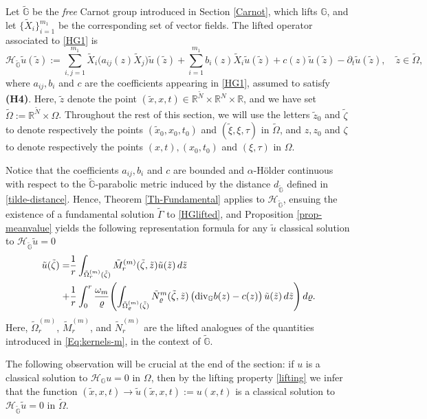 \documentclass[11pt,a4paper]{article}
\numberwithin{equation}{section}
\newcommand{\R}{\mathbb{R}}
\def \rn {{\mathbb {R}}^{N}}
\def \rnm {{\mathbb {R}}^{\tilde N}}
\def \r {\varrho}
\def \tt {\tilde}
\def \GG {{\mathbb{G}}}
\def \div {{\text{\rm div}}}
\def \p {\partial}
\def \ti {\times}
\def \H {\mathscr{H}_\GG}
\def \HG {\mathscr{H}_{\tilde\GG}}
\def \a {{\alpha}}
\def \G {{\Gamma}}
\def \t {{\tau}}
\def \x {{\xi}}
\def \z {{\zeta}}
\def \O {{\Omega}}
\begin{document}
{{\medskip

Let $\tt \GG$ be the \emph{free} Carnot group introduced in Section \ref{Carnot}, which lifts $\GG$, and let $\big\{\tt X_i\big\}_{i=1}^{m_1}$ be the corresponding set of vector fields. The lifted operator  associated to \eqref{HG1} is
\begin{equation}\label{HGlifted}
	\HG \tilde u(\tt z):=\sum_{i,j=1}^{m_1} \tilde X_i\Big(a_{ij}(z)\tilde X_j\Big)\tilde u(\tt z) + \sum_{i=1}^{m_1} b_i(z)\tilde X_i\tilde u(\tt z)+ c(z)\tilde u(\tt z)-\p_t \tilde u(\tt z),\quad \tt z\in \tilde{\O},
\end{equation}
where $a_{ij},b_i$ and $c$ are the coefficients appearing in \eqref{HG1}, assumed to satisfy \textbf{(H4)}. Here, $\tt z$ denote the point $(\tt x,x,t)\in \R^{\tt N}\ti \rn \ti \R$, and we have set $\tilde \O:= \rnm \ti \O$. Throughout the rest of this section, we will use the letters $\tt z_0$ and $\tt \z$ to denote respectively the points $(\tt x_0,x_0 ,t_0)$ and $ (\tt \x, \x,\t)$ in $\tilde \O$, and $z, z_0$ and $\z$ to denote respectively the points $(x ,t),(x_0 ,t_0)$ and $ (\x,\t)$ in $\O$.


Notice that the coefficients $a_{ij}, b_i$ and $c$ are bounded and $\a$-H\"older continuous with respect to the $\tt{\GG}$-parabolic metric induced by the distance $d_{\tt\GG}$ defined in \eqref{tilde-distance}. Hence, Theorem \ref{Th-Fundamental} applies to $\HG$, ensuing the existence of a fundamental solution $\tt\G$ to \eqref{HGlifted}, and Proposition \ref{prop-meanvalue}  yields the following representation formula for any $\tt u$ classical solution to $\HG \tt u = 0$ 
\begin{equation} \label{tilde-meanvalue} 
	\begin{aligned}
		\tt u(\tt \z) =& \frac{1}{r} \int_{\tt\Omega_r^{(m)}(\tt \z)} \tt M_r^{(m)} (\tt \z,\tt z) \tt u(\tt z) \, d\tt z\\
		+&\frac{1}{r} \int_0^{r} \frac{\omega_m}{\r} \Biggl(
		\int_{\tt \Omega^{(m)}_\r (\tt \z)}\tt N_\r^m(\tt \z,\tt z)\, \big( \div_\GG b(z) - c(z) \big) \,\tt u(\tt z) \, d\tt z   \Biggr) \, d \r.
	\end{aligned}
\end{equation} 
Here, $\tt\Omega_r^{(m)}$, $\tt M_r^{(m)}$, and $\tt N_r^{(m)}$  are the lifted analogues of the quantities introduced in \eqref{Eq:kernels-m}, in the context of $\tt \GG$. 


The following observation will be crucial at the end of the section: if $u$ is a classical solution to $\H u =0$ in $\O$, then by the lifting property \eqref{lifting} we infer that the function $(\tt x,x,t)\to \tilde u(\tilde{x},x,t):=u(x,t)$ is a classical solution to $\HG \tilde u = 0$ in $\tilde \O$. 


}}
\end{document}
